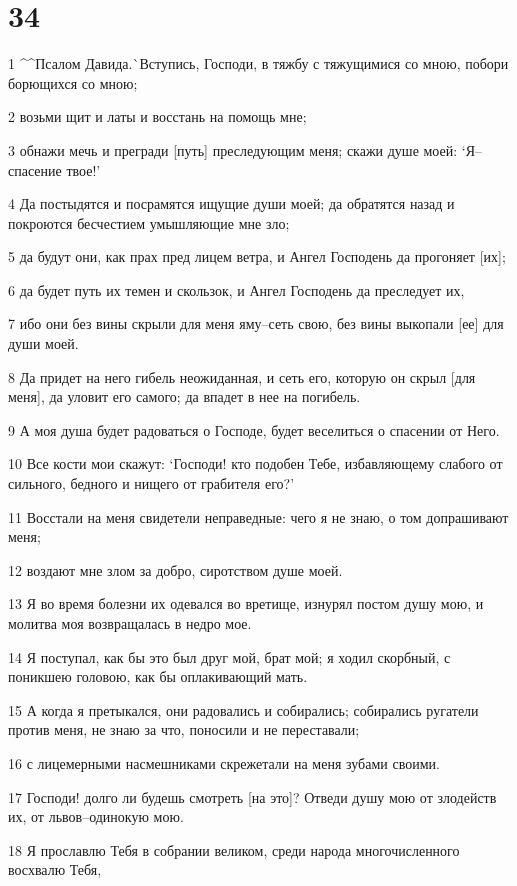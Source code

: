 \chapter{34}

\par 1 ^^Псалом Давида.^^ Вступись, Господи, в тяжбу с тяжущимися со мною, побори борющихся со мною;
\par 2 возьми щит и латы и восстань на помощь мне;
\par 3 обнажи мечь и прегради [путь] преследующим меня; скажи душе моей: `Я--спасение твое!'
\par 4 Да постыдятся и посрамятся ищущие души моей; да обратятся назад и покроются бесчестием умышляющие мне зло;
\par 5 да будут они, как прах пред лицем ветра, и Ангел Господень да прогоняет [их];
\par 6 да будет путь их темен и скользок, и Ангел Господень да преследует их,
\par 7 ибо они без вины скрыли для меня яму--сеть свою, без вины выкопали [ее] для души моей.
\par 8 Да придет на него гибель неожиданная, и сеть его, которую он скрыл [для меня], да уловит его самого; да впадет в нее на погибель.
\par 9 А моя душа будет радоваться о Господе, будет веселиться о спасении от Него.
\par 10 Все кости мои скажут: `Господи! кто подобен Тебе, избавляющему слабого от сильного, бедного и нищего от грабителя его?'
\par 11 Восстали на меня свидетели неправедные: чего я не знаю, о том допрашивают меня;
\par 12 воздают мне злом за добро, сиротством душе моей.
\par 13 Я во время болезни их одевался во вретище, изнурял постом душу мою, и молитва моя возвращалась в недро мое.
\par 14 Я поступал, как бы это был друг мой, брат мой; я ходил скорбный, с поникшею головою, как бы оплакивающий мать.
\par 15 А когда я претыкался, они радовались и собирались; собирались ругатели против меня, не знаю за что, поносили и не переставали;
\par 16 с лицемерными насмешниками скрежетали на меня зубами своими.
\par 17 Господи! долго ли будешь смотреть [на это]? Отведи душу мою от злодейств их, от львов--одинокую мою.
\par 18 Я прославлю Тебя в собрании великом, среди народа многочисленного восхвалю Тебя,
